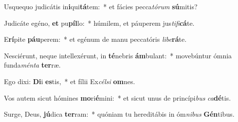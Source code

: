 \item Usquequo judicátis in\textbf{i}qui\textbf{tá}tem:~* et fácies pecca\textit{tó}\textit{rum} \textbf{sú}mitis?
\item Judicáte egéno, \textbf{et} pu\textbf{píl}lo:~* húmilem, et páuperem jus\textit{ti}\textit{fi}\textbf{cá}te.
\item E\textbf{rí}pite \textbf{páu}perem:~* et egénum de manu peccatóris \textit{li}\textit{be}\textbf{rá}te.
\item Nesciérunt, neque intellexérunt, in \textbf{té}nebris \textbf{ám}bulant:~* movebúntur ómnia funda\textit{mén}\textit{ta} \textbf{ter}ræ.
\item Ego dixi: \textbf{Di}i \textbf{es}tis,~* et fílii Ex\textit{cél}\textit{si} \textbf{om}nes.
\item Vos autem sicut hómines \textbf{mo}ri\textbf{é}mini:~* et sicut unus de princípi\textit{bus} \textit{ca}\textbf{dé}tis.
\item Surge, Deus, \textbf{jú}dica \textbf{ter}ram:~* quóniam tu hereditábis in óm\textit{ni}\textit{bus} \textbf{Gén}tibus.
